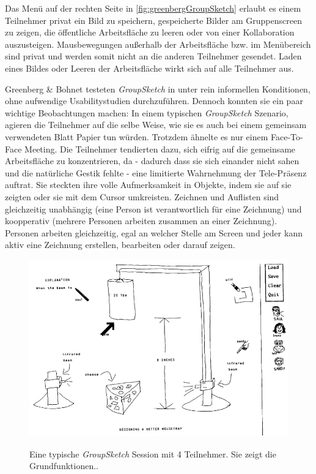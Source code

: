 \medskip Das Menü auf der rechten Seite in \autoref{fig:greenbergGroupSketch} erlaubt es einem Teilnehmer privat ein Bild zu speichern, gespeicherte Bilder am Gruppenscreen zu zeigen, die öffentliche Arbeitsfläche zu leeren oder von einer Kollaboration auszusteigen. Mausbewegungen außerhalb der Arbeitsfläche bzw. im Menübereich sind privat und werden somit nicht an die anderen Teilnehmer gesendet. Laden eines Bildes oder Leeren der Arbeitsfläche wirkt sich auf alle Teilnehmer aus.

\medskip Greenberg \& Bohnet testeten \emph{GroupSketch} in \citep{Greenberg:1991} unter rein informellen Konditionen, ohne aufwendige Usabilitystudien durchzuführen. Dennoch konnten sie ein paar wichtige Beobachtungen machen: In einem typischen \emph{GroupSketch} Szenario, agieren die Teilnehmer auf die selbe Weise, wie sie es auch bei einem gemeinsam verwendeten Blatt Papier tun würden. Trotzdem ähnelte es nur einem Face-To-Face Meeting. Die Teilnehmer tendierten dazu, sich eifrig auf die gemeinsame Arbeitsfläche zu konzentrieren, da - dadurch dass sie sich einander nicht sahen und die natürliche Gestik fehlte - eine limitierte Wahrnehmung der Tele-Präsenz auftrat. Sie steckten ihre volle Aufmerksamkeit in Objekte, indem sie auf sie zeigten oder sie mit dem Cursor umkreisten. 
Zeichnen und Auflisten sind gleichzeitig unabhängig (eine Person ist verantwortlich für eine Zeichnung) und koopperativ (mehrere Personen arbeiten zusammen an einer Zeichnung). Personen arbeiten gleichzeitig, egal an welcher Stelle am Screen und jeder kann aktiv eine Zeichnung erstellen, bearbeiten oder darauf zeigen. 

\begin{figure}
        {\includegraphics[width=1\linewidth]{gfx/greenbergGroupSketch}}
		\caption[GroupSketch]{Eine typische \emph{GroupSketch} Session mit 4 Teilnehmer. Sie zeigt die Grundfunktionen..}\label{fig:greenbergGroupSketch}
\end{figure}

